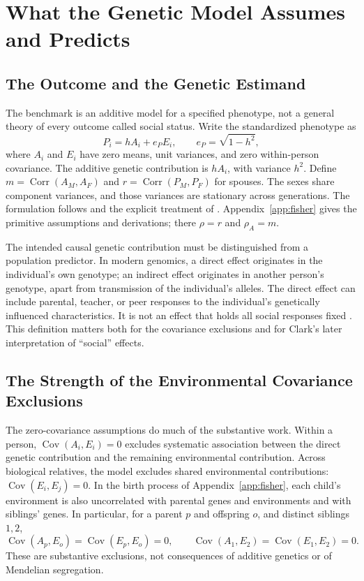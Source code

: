 \section{What the Genetic Model Assumes and Predicts}
\label{sec:fisher-model}
\subsection{The Outcome and the Genetic Estimand}
\label{sec:model-components}
The benchmark is an additive model for a specified phenotype, not a general
theory of every outcome called social status. Write the standardized phenotype
as
\[
 P_i=hA_i+e_P E_i,\qquad e_P=\sqrt{1-h^2},
\]
where $A_i$ and $E_i$ have zero means, unit variances, and zero within-person
covariance. The additive genetic contribution is $hA_i$, with variance
$h^2$. Define $m=\operatorname{Corr}(A_M,A_F)$ and
$r=\operatorname{Corr}(P_M,P_F)$ for spouses. The sexes share component
variances, and those variances are stationary across generations.
The formulation follows \citet{Fisher1918} and the explicit treatment of \citet{OttoEtAl1994}. Appendix~\ref{app:fisher} gives the primitive assumptions and derivations;
there $\rho=r$ and $\rho_A=m$.

The intended causal genetic contribution must be distinguished from a
population predictor. In modern genomics, a direct effect originates in
the individual's own genotype; an indirect effect originates in another
person's genotype, apart from transmission of the individual's alleles.
The direct effect can include parental, teacher, or peer responses to the
individual's genetically influenced characteristics. It is not an effect
that holds all social responses fixed
\citep[Sections~3.1 and~3.4]{BenjaminEtAl2026}. This definition matters both
for the covariance exclusions and for Clark's later interpretation of
``social'' effects.

\subsection{The Strength of the Environmental Covariance Exclusions}
\label{sec:environmental-exclusions}

The zero-covariance assumptions do much of the substantive work. Within
a person, $\operatorname{Cov}(A_i,E_i)=0$ excludes systematic association
between the direct genetic contribution and the remaining environmental
contribution. Across biological relatives, the model excludes shared
environmental contributions: $\operatorname{Cov}(E_i,E_j)=0$. In the birth
process of Appendix~\ref{app:fisher}, each child's environment is also uncorrelated with parental
genes and environments and with siblings' genes. In particular, for a
parent $p$ and offspring $o$, and distinct siblings $1,2$,
\[
 \operatorname{Cov}(A_p,E_o)=\operatorname{Cov}(E_p,E_o)=0,
 \qquad
 \operatorname{Cov}(A_1,E_2)=\operatorname{Cov}(E_1,E_2)=0.
\]
These are substantive exclusions, not consequences of additive genetics
or of Mendelian segregation.

